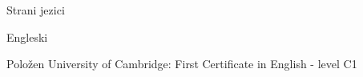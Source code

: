 \documentclass{resume} %
\begin{document}

\begin{rSection}{Strani jezici}
\begin{rSubsection}{Engleski}{}{}{}
\item Polo\v{z}en University of Cambridge: First Certificate in English - level C1
\end{rSubsection}
\end{rSection}

\end{document}
